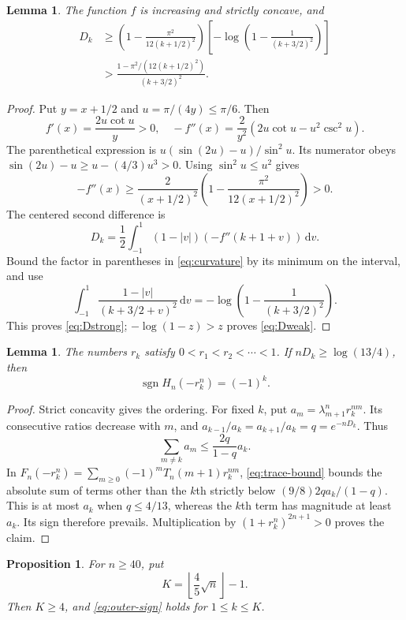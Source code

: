 \documentclass[11pt,letterpaper]{article}
\numberwithin{equation}{section}
\newtheorem{lemma}[theorem]{Lemma}
\newtheorem{proposition}[theorem]{Proposition}
\newcommand{\sgn}{\operatorname{sgn}}
\newcommand{\dd}{\,\mathrm d}
\begin{document}
\begin{lemma}\label{lem:curvature}
The function $f$ is increasing and strictly concave, and
\begin{align}
 D_k&\ge\left(1-\frac{\pi^2}{12(k+1/2)^2}\right)
 \left[-\log\left(1-\frac1{(k+3/2)^2}\right)\right]\label{eq:Dstrong}\\
 &>\frac{1-\pi^2/(12(k+1/2)^2)}{(k+3/2)^2}.\label{eq:Dweak}
\end{align}
\end{lemma}
\begin{proof}
Put $y=x+1/2$ and $u=\pi/(4y)\le\pi/6$. Then
\[
 f'(x)=\frac{2u\cot u}{y}>0,\quad
 -f''(x)=\frac2{y^2}(2u\cot u-u^2\csc^2u).
\]
The parenthetical expression is $u(\sin(2u)-u)/\sin^2u$. Its numerator obeys $\sin(2u)-u\ge u-(4/3)u^3>0$. Using $\sin^2u\le u^2$ gives
\begin{equation}\label{eq:curvature}
 -f''(x)\ge\frac2{(x+1/2)^2}
 \left(1-\frac{\pi^2}{12(x+1/2)^2}\right)>0.
\end{equation}
The centered second difference is
\[
 D_k=\frac12\int_{-1}^{1}(1-|v|)(-f''(k+1+v))\dd v.
\]
Bound the factor in parentheses in \eqref{eq:curvature} by its minimum on the interval, and use
\[
 \int_{-1}^{1}\frac{1-|v|}{(k+3/2+v)^2}\dd v
 =-\log\left(1-\frac1{(k+3/2)^2}\right).
\]
This proves \eqref{eq:Dstrong}; $-\log(1-z)>z$ proves \eqref{eq:Dweak}.
\end{proof}
\begin{lemma}\label{lem:outer-sign}
The numbers $r_k$ satisfy $0<r_1<r_2<\cdots<1$. If $nD_k\ge\log(13/4)$, then
\begin{equation}\label{eq:outer-sign}\sgn H_n(-r_k^n)=(-1)^k.\end{equation}
\end{lemma}
\begin{proof}
Strict concavity gives the ordering. For fixed $k$, put $a_m=\lambda_{m+1}^nr_k^{nm}$. Its consecutive ratios decrease with $m$, and
$a_{k-1}/a_k=a_{k+1}/a_k=q=e^{-nD_k}$. Thus
\[
 \sum_{m\ne k}a_m\le\frac{2q}{1-q}a_k.
\]
In $F_n(-r_k^n)=\sum_{m\ge0}(-1)^mT_n(m+1)r_k^{nm}$, \eqref{eq:trace-bound} bounds the absolute sum of terms other than the $k$th strictly below $(9/8)2q a_k/(1-q)$. This is at most $a_k$ when $q\le4/13$, whereas the $k$th term has magnitude at least $a_k$. Its sign therefore prevails. Multiplication by $(1+r_k^n)^{2n+1}>0$ proves the claim.
\end{proof}
\begin{proposition}\label{prop:outer-range}
For $n\ge40$, put
\begin{equation}\label{eq:K}K=\left\lfloor\frac45\sqrt n\right\rfloor-1.\end{equation}
Then $K\ge4$, and \eqref{eq:outer-sign} holds for $1\le k\le K$.
\end{proposition}
\end{document}
